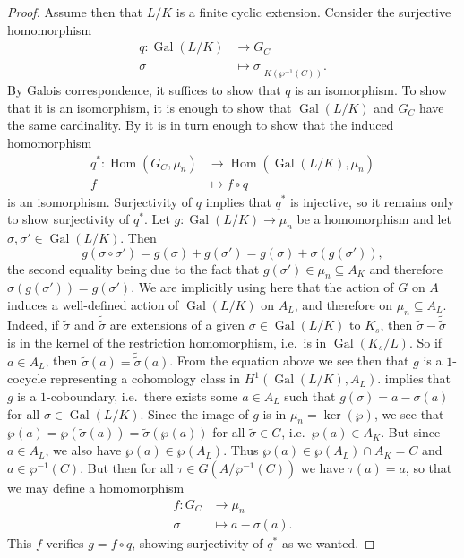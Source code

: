 \documentclass[12pt]{amsart}
\DeclareMathOperator{\Hom}{Hom}
\DeclareMathOperator{\Gal}{Gal}
\begin{document}
\begin{thm}
\begin{proof}
	Assume then that $L/K$ is a finite cyclic extension.
	Consider the surjective homomorphism
	\begin{align*}
	    q\colon \Gal(L/K) & \longrightarrow G_{C} \\
	    \sigma & \longmapsto \sigma|_{K(\wp^{-1}(C))}.
	\end{align*}
	By Galois correspondence, it suffices to show that $q$ is an isomorphism.
	To show that it is an isomorphism, it is enough to show that $\Gal(L/K)$ and $G_{C}$ have the same cardinality.
	By  it is in turn enough to show that the induced homomorphism
	\begin{align*}
	    q^{*}\colon \Hom(G_{C},\mu_{n}) & \longrightarrow \Hom(\Gal(L/K),\mu_{n}) \\
	    f & \longmapsto f\circ q
	\end{align*}
	is an isomorphism.
	Surjectivity of $q$ implies that $q^{*}$ is injective, so it remains only to show surjectivity of $q^{*}$.
	Let $g\colon \Gal(L/K)\to \mu_{n}$ be a homomorphism and let $\sigma,\sigma'\in \Gal(L/K)$.
	Then
	\[ g(\sigma\circ \sigma')=g(\sigma)+g(\sigma')=g(\sigma)+\sigma(g(\sigma')), \]
	the second equality being due to the fact that $g(\sigma')\in \mu_{n}\subseteq A_{K}$ and therefore $\sigma(g(\sigma'))=g(\sigma')$.
	We are implicitly using here that the action of $G$ on $A$ induces a well-defined action of $\Gal(L/K)$ on $A_{L}$, and therefore on $\mu_{n}\subseteq A_{L}$.
	Indeed, if $\tilde{\sigma}$ and $\tilde{\tilde{\sigma}}$ are extensions of a given $\sigma\in \Gal(L/K)$ to $K_{s}$, then $\tilde{\sigma}-\tilde{\tilde{\sigma}}$ is in the kernel of the restriction homomorphism, i.e.~is in $\Gal(K_{s}/L)$.
	So if $a\in A_{L}$, then $\tilde{\sigma}(a)=\tilde{\tilde{\sigma}}(a)$.
	From the equation above we see then that $g$ is a $1$-cocycle representing a cohomology class in $H^{1}(\Gal(L/K),A_{L})$.
	 implies that $g$ is a $1$-coboundary, i.e.~there exists some $a\in A_{L}$ such that $g(\sigma)=a-\sigma(a)$ for all $\sigma\in \Gal(L/K)$.
	Since the image of $g$ is in $\mu_{n}=\ker(\wp)$, we see that $\wp(a)=\wp(\tilde{\sigma}(a))=\tilde{\sigma}(\wp(a))$ for all $\tilde{\sigma} \in G$, i.e.~$\wp(a)\in A_{K}$.
	But since $a\in A_{L}$, we also have $\wp(a)\in \wp(A_{L})$.
	Thus $\wp(a)\in \wp(A_{L})\cap A_{K}=C$ and $a\in \wp^{-1}(C)$.
	But then for all $\tau\in G(A/\wp^{-1}(C))$ we have $\tau(a)=a$, so that we may define a homomorphism
	\begin{align*}
	    f\colon G_{C} & \longrightarrow \mu_{n} \\
	    \sigma & \longmapsto a-\sigma(a).
	\end{align*}
	This $f$ verifies $g=f\circ q$, showing surjectivity of $q^{*}$ as we wanted.
    \end{proof}
\end{thm}



\vfill
\end{document}
